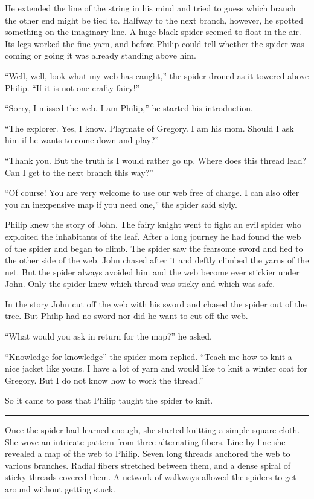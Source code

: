 \documentclass[10pt, draft]{memoir}
\renewcommand{\pfbreakdisplay}{\bigskip \ding{166} \bigskip}
\newcommand{\secbreak}{\fancybreak{\pfbreakdisplay}}
\begin{document}
He extended the line of the string in his mind and tried to guess which branch the other end might be tied to. Halfway to the next branch, however, he spotted something on the imaginary line. A huge black spider seemed to float in the air. Its legs worked the fine yarn, and before Philip could tell whether the spider was coming or going it was already standing above him.

``Well, well, look what my web has caught,'' the spider droned as it towered above Philip. ``If it is not one crafty fairy!''

``Sorry, I missed the web. I am Philip,'' he started his introduction.

``The explorer. Yes, I know. Playmate of Gregory. I am his mom. Should I ask him if he wants to come down and play?''

``Thank you. But the truth is I would rather go up. Where does this thread lead? Can I get to the next branch this way?''

``Of course! You are very welcome to use our web free of charge. I can also offer you an inexpensive map if you need one,'' the spider said slyly.

Philip knew the story of John. The fairy knight went to fight an evil spider who exploited the inhabitants of the leaf. After a long journey he had found the web of the spider and began to climb. The spider saw the fearsome sword and fled to the other side of the web. John chased after it and deftly climbed the yarns of the net. But the spider always avoided him and the web become ever stickier under John. Only the spider knew which thread was sticky and which was safe.

In the story John cut off the web with his sword and chased the spider out of the tree. But Philip had no sword nor did he want to cut off the web.

``What would you ask in return for the map?'' he asked.

``Knowledge for knowledge'' the spider mom replied. ``Teach me how to knit a nice jacket like yours. I have a lot of yarn and would like to knit a winter coat for Gregory. But I do not know how to work the thread.''

So it came to pass that Philip taught the spider to knit.

\secbreak

Once the spider had learned enough, she started knitting a simple square cloth. She wove an intricate pattern from three alternating fibers. Line by line she revealed a map of the web to Philip. Seven long threads anchored the web to various branches. Radial fibers stretched between them, and a dense spiral of sticky threads covered them. A network of walkways allowed the spiders to get around without getting stuck.
\end{document}
